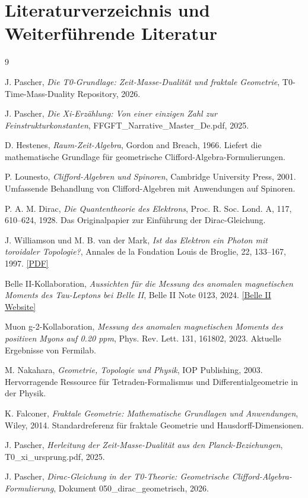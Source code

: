 \section*{Literaturverzeichnis und Weiterführende Literatur}

\begin{thebibliography}{9}
	
	J. Pascher,
	\textit{Die T0-Grundlage: Zeit-Masse-Dualität und fraktale Geometrie},
	T0-Time-Mass-Duality Repository,
	2026.
	
	J. Pascher,
	\textit{Die Xi-Erzählung: Von einer einzigen Zahl zur Feinstrukturkonstanten},
	FFGFT\_Narrative\_Master\_De.pdf,
	2025.
	
	D. Hestenes,
	\textit{Raum-Zeit-Algebra},
	Gordon and Breach, 1966.
	Liefert die mathematische Grundlage für geometrische Clifford-Algebra-Formulierungen.
	
	P. Lounesto,
	\textit{Clifford-Algebren und Spinoren},
	Cambridge University Press, 2001.
	Umfassende Behandlung von Clifford-Algebren mit Anwendungen auf Spinoren.
	
	P. A. M. Dirac,
	\textit{Die Quantentheorie des Elektrons},
	Proc. R. Soc. Lond. A, 117, 610–624, 1928.
	Das Originalpapier zur Einführung der Dirac-Gleichung.
	
	J. Williamson und M. B. van der Mark,
	\textit{Ist das Elektron ein Photon mit toroidaler Topologie?},
	Annales de la Fondation Louis de Broglie, 22, 133–167, 1997.
	\href{https://fondationlouisdebroglie.org/IMG/pdf/22_2_133.pdf}{[PDF]}
	
	Belle II-Kollaboration,
	\textit{Aussichten für die Messung des anomalen magnetischen Moments des Tau-Leptons bei Belle II},
	Belle II Note 0123, 2024.
	\href{https://www.belle2.org}{[Belle II Website]}
	
	Muon g-2-Kollaboration,
	\textit{Messung des anomalen magnetischen Moments des positiven Myons auf 0.20 ppm},
	Phys. Rev. Lett. 131, 161802, 2023.
	Aktuelle Ergebnisse von Fermilab.
	
	M. Nakahara,
	\textit{Geometrie, Topologie und Physik},
	IOP Publishing, 2003.
	Hervorragende Ressource für Tetraden-Formalismus und Differentialgeometrie in der Physik.
	
	K. Falconer,
	\textit{Fraktale Geometrie: Mathematische Grundlagen und Anwendungen},
	Wiley, 2014.
	Standardreferenz für fraktale Geometrie und Hausdorff-Dimensionen.
	
	J. Pascher,
	\textit{Herleitung der Zeit-Masse-Dualität aus den Planck-Beziehungen},
	T0\_xi\_ursprung.pdf,
	2025.
	
	J. Pascher,
	\textit{Dirac-Gleichung in der T0-Theorie: Geometrische Clifford-Algebra-Formulierung},
	Dokument 050\_dirac\_geometrisch,
	2026.

\end{thebibliography}
	